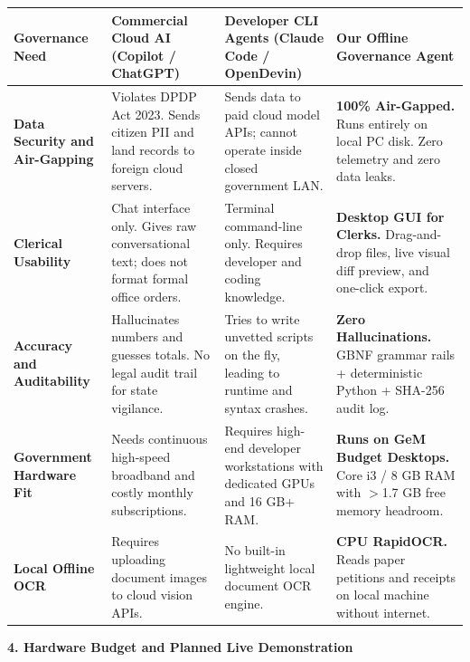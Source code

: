 \documentclass[11pt,a4paper]{article}
\begin{document}
\noindent
\begin{tabular}{|p{2.8cm}|p{4.2cm}|p{4.2cm}|p{4.2cm}|}
\hline
\textbf{Governance Need} & \textbf{Commercial Cloud AI (Copilot / ChatGPT)} & \textbf{Developer CLI Agents (Claude Code / OpenDevin)} & \textbf{Our Offline Governance Agent} \\
\hline

\textbf{Data Security and Air-Gapping}
& Violates DPDP Act 2023. Sends citizen PII and land records to foreign cloud servers.
& Sends data to paid cloud model APIs; cannot operate inside closed government LAN.
& \textbf{100\% Air-Gapped.} Runs entirely on local PC disk. Zero telemetry and zero data leaks.
\\
\hline

\textbf{Clerical Usability}
& Chat interface only. Gives raw conversational text; does not format formal office orders.
& Terminal command-line only. Requires developer and coding knowledge.
& \textbf{Desktop GUI for Clerks.} Drag-and-drop files, live visual diff preview, and one-click export.
\\
\hline

\textbf{Accuracy and Auditability}
& Hallucinates numbers and guesses totals. No legal audit trail for state vigilance.
& Tries to write unvetted scripts on the fly, leading to runtime and syntax crashes.
& \textbf{Zero Hallucinations.} GBNF grammar rails + deterministic Python + SHA-256 audit log.
\\
\hline

\textbf{Government Hardware Fit}
& Needs continuous high-speed broadband and costly monthly subscriptions.
& Requires high-end developer workstations with dedicated GPUs and 16 GB+ RAM.
& \textbf{Runs on GeM Budget Desktops.} Core i3 / 8 GB RAM with $>$1.7 GB free memory headroom.
\\
\hline

\textbf{Local Offline OCR}
& Requires uploading document images to cloud vision APIs.
& No built-in lightweight local document OCR engine.
& \textbf{CPU RapidOCR.} Reads paper petitions and receipts on local machine without internet.
\\
\hline

\end{tabular}

\vspace{0.4cm}

\noindent\textbf{\large 4. Hardware Budget and Planned Live Demonstration}
\end{document}
